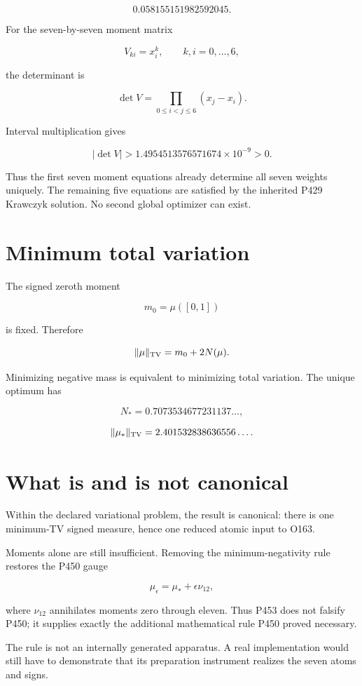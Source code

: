 \documentclass[11pt,a4paper,openany]{report}
\begin{document}
\[
0.058155151982592045.
\]

For the seven-by-seven moment matrix

\[
V_{ki}=x_i^k,
\qquad k,i=0,\ldots,6,
\]

the determinant is

\[
\det V=\prod_{0\le i<j\le6}(x_j-x_i).
\]

Interval multiplication gives

\[
|\det V|>1.4954513576571674\times10^{-9}>0.
\]

Thus the first seven moment equations already determine all seven weights uniquely. The remaining five equations are satisfied by the inherited P429 Krawczyk solution. No second global optimizer can exist.

\section{Minimum total variation}

The signed zeroth moment

\[
m_0=\mu([0,1])
\]

is fixed. Therefore

\[
\lVert\mu\rVert_{\rm TV}=m_0+2N(\mu).
\]

Minimizing negative mass is equivalent to minimizing total variation. The unique optimum has

\[
N_*=0.7073534677231137\ldots,
\]

\[
\lVert\mu_*\rVert_{\rm TV}
=2.401532838636556\ldots .
\]

\section{What is and is not canonical}

Within the declared variational problem, the result is canonical: there is one minimum-TV signed measure, hence one reduced atomic input to O163.

Moments alone are still insufficient. Removing the minimum-negativity rule restores the P450 gauge

\[
\mu_\epsilon=\mu_*+\epsilon\nu_{12},
\]

where \(\nu_{12}\) annihilates moments zero through eleven. Thus P453 does not falsify P450; it supplies exactly the additional mathematical rule P450 proved necessary.

The rule is not an internally generated apparatus. A real implementation would still have to demonstrate that its preparation instrument realizes the seven atoms and signs.
\end{document}
